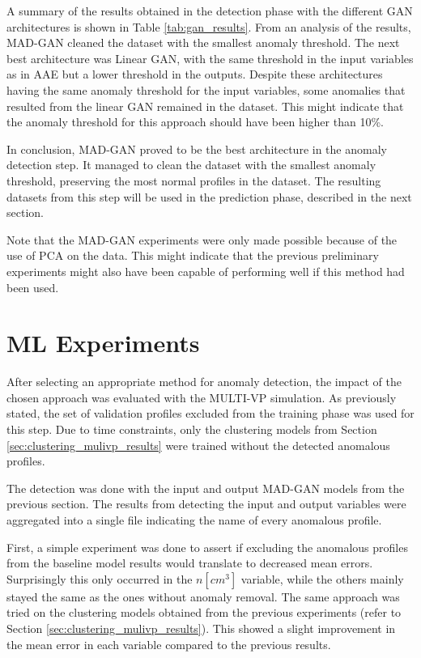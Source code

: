 A summary of the results obtained in the detection phase with the different GAN architectures is shown in Table \ref{tab:gan_results}. From an analysis of the results, MAD-GAN cleaned the dataset with the smallest anomaly threshold. The next best architecture was Linear GAN, with the same threshold in the input variables as in AAE but a lower threshold in the outputs. Despite these architectures having the same anomaly threshold for the input variables, some anomalies that resulted from the linear GAN remained in the dataset. This might indicate that the anomaly threshold for this approach should have been higher than 10\%.

In conclusion, MAD-GAN proved to be the best architecture in the anomaly detection step. It managed to clean the dataset with the smallest anomaly threshold, preserving the most normal profiles in the dataset. The resulting datasets from this step will be used in the prediction phase, described in the next section.

Note that the MAD-GAN experiments were only made possible because of the use of PCA on the data. This might indicate that the previous preliminary experiments might also have been capable of performing well if this method had been used.


\section{ML Experiments}\label{sec:ml_experiments_gan}
After selecting an appropriate method for anomaly detection, the impact of the chosen approach was evaluated with the MULTI-VP simulation. As previously stated, the set of validation profiles excluded from the training phase was used for this step. Due to time constraints, only the clustering models from Section \ref{sec:clustering_mulivp_results} were trained without the detected anomalous profiles.

The detection was done with the input and output MAD-GAN models from the previous section. The results from detecting the input and output variables were aggregated into a single file indicating the name of every anomalous profile. 

First, a simple experiment was done to assert if excluding the anomalous profiles from the baseline model results would translate to decreased mean errors. Surprisingly this only occurred in the $n [cm^3]$ variable, while the others mainly stayed the same as the ones without anomaly removal. The same approach was tried on the clustering models obtained from the previous experiments (refer to Section \ref{sec:clustering_mulivp_results}). This showed a slight improvement in the mean error in each variable compared to the previous results.

